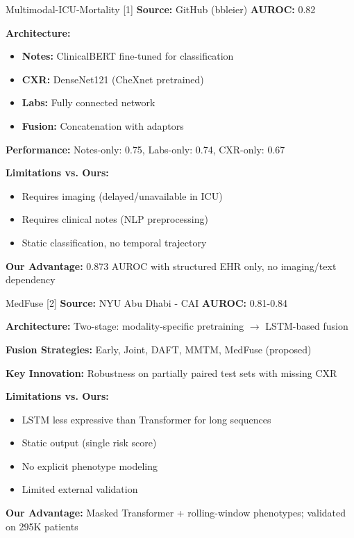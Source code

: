 \documentclass[11pt,a4paper]{article}
\begin{document}
\begin{competitorbox}{Multimodal-ICU-Mortality [1]}
\textbf{Source:} GitHub (bbleier) \hfill \textbf{AUROC:} 0.82

\textbf{Architecture:}
\begin{itemize}[nosep,leftmargin=1em]
    \item \textbf{Notes:} ClinicalBERT fine-tuned for classification
    \item \textbf{CXR:} DenseNet121 (CheXnet pretrained)
    \item \textbf{Labs:} Fully connected network
    \item \textbf{Fusion:} Concatenation with adaptors
\end{itemize}

\textbf{Performance:} Notes-only: 0.75, Labs-only: 0.74, CXR-only: 0.67

\textbf{Limitations vs. Ours:}
\begin{itemize}[nosep,leftmargin=1em]
    \item Requires imaging (delayed/unavailable in ICU)
    \item Requires clinical notes (NLP preprocessing)
    \item Static classification, no temporal trajectory
\end{itemize}

\textbf{Our Advantage:} 0.873 AUROC with structured EHR only, no imaging/text dependency
\end{competitorbox}

\vspace{0.3cm}

\begin{competitorbox}{MedFuse [2]}
\textbf{Source:} NYU Abu Dhabi - CAI \hfill \textbf{AUROC:} 0.81-0.84

\textbf{Architecture:} Two-stage: modality-specific pretraining $\rightarrow$ LSTM-based fusion

\textbf{Fusion Strategies:} Early, Joint, DAFT, MMTM, MedFuse (proposed)

\textbf{Key Innovation:} Robustness on partially paired test sets with missing CXR

\textbf{Limitations vs. Ours:}
\begin{itemize}[nosep,leftmargin=1em]
    \item LSTM less expressive than Transformer for long sequences
    \item Static output (single risk score)
    \item No explicit phenotype modeling
    \item Limited external validation
\end{itemize}

\textbf{Our Advantage:} Masked Transformer + rolling-window phenotypes; validated on 295K patients
\end{competitorbox}
\end{document}
